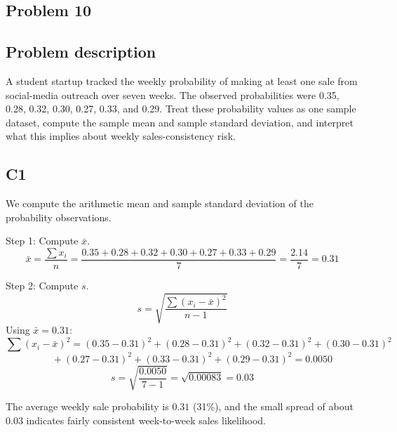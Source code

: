 \begin{ExamProblems}
		\newpage
		\item
		\subsection*{Problem 10}
		\subsection*{Problem description}
		A student startup tracked the weekly probability of making at least one sale from social-media outreach over seven weeks. The observed probabilities were 0.35, 0.28, 0.32, 0.30, 0.27, 0.33, and 0.29. Treat these probability values as one sample dataset, compute the sample mean and sample standard deviation, and interpret what this implies about weekly sales-consistency risk.

		\subsection*{C1}
		We compute the arithmetic mean and sample standard deviation of the probability observations.

		Step 1: Compute $\bar{x}$.
		\[
		\bar{x} = \frac{\sum x_i}{n}
		= \frac{0.35+0.28+0.32+0.30+0.27+0.33+0.29}{7}
		= \frac{2.14}{7}
		= 0.31
		\]

		Step 2: Compute $s$.
		\[
		s = \sqrt{\frac{\sum (x_i-\bar{x})^2}{n-1}}
		\]
		Using $\bar{x}=0.31$:
		\[
		\sum (x_i-\bar{x})^2 = (0.35-0.31)^2+(0.28-0.31)^2+(0.32-0.31)^2+(0.30-0.31)^2
		\]
		\[
		\qquad +(0.27-0.31)^2+(0.33-0.31)^2+(0.29-0.31)^2 = 0.0050
		\]
		\[
		s = \sqrt{\frac{0.0050}{7-1}} = \sqrt{0.00083} = 0.03
		\]

		The average weekly sale probability is $0.31$ (31\%), and the small spread of about $0.03$ indicates fairly consistent week-to-week sales likelihood.

	\end{ExamProblems}

